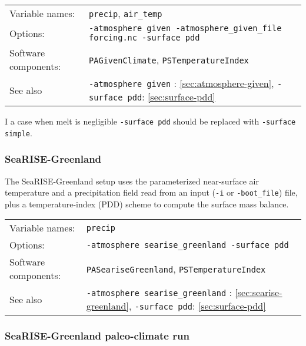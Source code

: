 \documentclass[titlepage,letterpaper,final]{scrartcl}
\begin{document}
\begin{center}
  \begin{tabular}{lp{}}
    \toprule
    Variable names: & \texttt{precip}, \texttt{air_temp} \\
    Options: & \texttt{-atmosphere given -atmosphere_given_file forcing.nc -surface~pdd} \\
    Software components: & \texttt{PAGivenClimate}, \texttt{PSTemperatureIndex} \\
    See also & \texttt{-atmosphere given} : \ref{sec:atmosphere-given},
    \texttt{-surface pdd}: \ref{sec:surface-pdd} \\
    \bottomrule
  \end{tabular}
\end{center}

I a case when melt is  negligible \texttt{-surface pdd} should be replaced with
\texttt{-surface simple}.

\subsubsection{SeaRISE-Greenland}
\label{sec:use-case-searise-greenland}

The SeaRISE-Greenland setup uses the parameterized near-surface air temperature
\cite{Faustoetal2009} and a precipitation field read from an input (\texttt{-i}
or \texttt{-boot_file}) file, plus  a temperature-index (PDD) scheme to compute
the surface mass balance.

\begin{center}
  \begin{tabular}{lp{}}
    \toprule
    Variable names: & \texttt{precip} \\
    Options: & \texttt{-atmosphere searise_greenland -surface~pdd} \\
    Software components: & \texttt{PASeariseGreenland}, \texttt{PSTemperatureIndex} \\
    See also & \texttt{-atmosphere searise_greenland} : \ref{sec:searise-greenland},
    \texttt{-surface pdd}: \ref{sec:surface-pdd} \\
    \bottomrule
  \end{tabular}
\end{center}

\subsubsection{SeaRISE-Greenland paleo-climate run}
\label{sec:use-case-searise-greenland-paleo}
\end{document}
